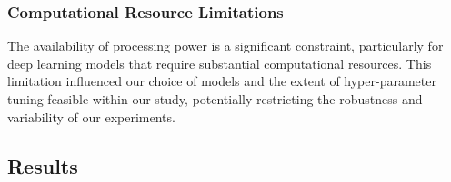 \documentclass[conference]{IEEEtran}
\begin{document}
\subsubsection{Computational Resource Limitations}
The availability of processing power is a significant constraint, particularly for deep learning models that require substantial computational resources. This limitation influenced our choice of models and the extent of hyper-parameter tuning feasible within our study, potentially restricting the robustness and variability of our experiments.
\subsection{Results}












\end{document}
